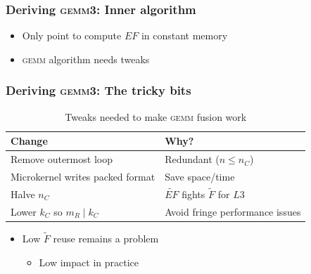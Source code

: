 \documentclass{beamer}
\newcommand*{\gemmt}{{\textsc{gemm3}}}
\newcommand*{\gemm}{{\textsc{gemm}}}
\begin{document}
\begin{frame}
  \frametitle{Deriving \gemmt{}: Inner algorithm}
  \begin{adjustbox}{max size={!}{0.5\textheight},center}
  \end{adjustbox}
  \begin{itemize}
  \item Only point to compute $EF$ in constant memory
  \item \gemm{} algorithm needs tweaks
  \end{itemize}

\end{frame}

\begin{frame}
  \frametitle{Deriving \gemmt{}: The tricky bits}
  \begin{table}
    \centering
    \begin{tabular}{l|l}
      Change&Why?\\\hline\hline
      Remove outermost loop&Redundant ($n \leq n_C$)\\
      Microkernel writes packed format&Save space/time\\
      Halve $n_C$&$\widetilde{EF}$ fights $\widetilde{F}$ for $L3$\\
      Lower $k_C$ so $m_R \mid k_C$&Avoid fringe performance issues\\
    \end{tabular}
    \caption{Tweaks needed to make \gemm{} fusion work}
    \label{tab:gemm3-issues}
  \end{table}
  \begin{itemize}
  \item Low $\widetilde{F}$ reuse remains a problem
    \begin{itemize}
    \item Low impact in practice
    \end{itemize}
  \end{itemize}
\end{frame}
\end{document}
